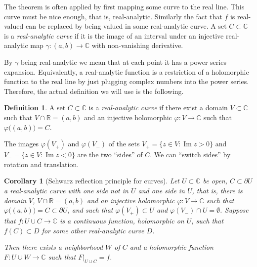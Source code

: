 \documentclass[12pt,openany]{book}
\renewcommand{\Im}{\operatorname{Im}}
\newcommand{\C}{{\mathbb{C}}}
\newcommand{\R}{{\mathbb{R}}}
\newcommand{\myindex}[1]{#1\index{#1}}
\newcommand{\myquote}[1]{``#1''}
\theoremstyle{plain}
\newtheorem{cor}[thm]{Corollary}
\theoremstyle{remark}
\theoremstyle{definition}
\newtheorem{defn}[thm]{Definition}
\theoremstyle{exercise}
\theoremstyle{example}
\begin{document}
The theorem is often applied by first mapping some curve to the real line.
This curve must be nice enough, that is, real-analytic.  Similarly the fact
that $f$ is real-valued can be replaced by being valued in some
real-analytic curve.
A set
$C \subset \C$ is a \emph{\myindex{real-analytic curve}}
if it is the image of an interval under an injective real-analytic
map $\gamma \colon (a,b) \to \C$ with non-vanishing derivative.

By $\gamma$ being real-analytic we mean that at each point it has a power
series expansion.  Equivalently, a real-analytic function is a
restriction of a holomorphic function to the real line by just plugging
complex numbers into the power series.  Therefore, the actual definition we
will use is the following.

\begin{defn}
A set $C \subset \C$ is a \emph{real-analytic curve}
if there exist a domain $V \subset \C$ such that
$V \cap \R = (a,b)$ and an injective holomorphic $\varphi \colon V \to \C$
such that $\varphi\bigl( (a,b) \bigr) = C$.
\end{defn}

The images $\varphi(V_+)$ and $\varphi(V_-)$ of the sets
$V_+ = \{ z \in V : \Im z > 0 \}$ and $V_- = \{ z \in V : \Im z < 0 \}$
are the two \myquote{sides} of $C$.
We can \myquote{switch sides} by rotation and translation.

\begin{cor}[Schwarz reflection principle for curves]
Let $U \subset \C$ be open,
$C \subset \partial U$ a real-analytic curve with one side
not in $U$ and one side in $U$, that is, there is domain $V$,
$V \cap \R = (a,b)$ and an injective holomorphic $\varphi \colon V \to \C$
such that $\varphi\bigl( (a,b) \bigr) = C \subset \partial U$,
and such that $\varphi(V_+) \subset U$ and $\varphi(V_-) \cap U =
\emptyset$.  Suppose that $f \colon U \cup C \to \C$ is a continuous
function, holomorphic on $U$, such that $f(C) \subset D$ for some
other real-analytic curve $D$.

Then there exists a neighborhood $W$ of $C$ and a holomorphic
function $F \colon U \cup W \to \C$ such that $F|_{U \cup C} = f$.
\end{cor}
\end{document}
